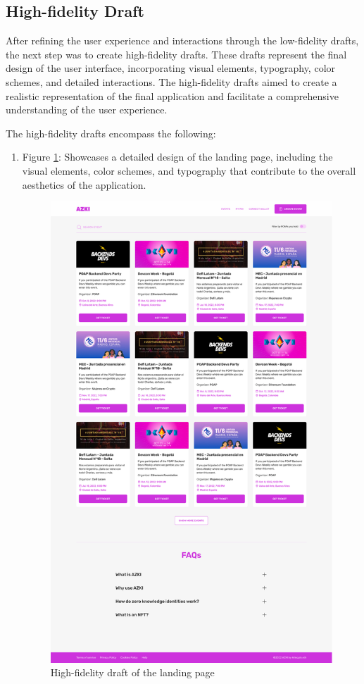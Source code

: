 \subsection{High-fidelity Draft}

After refining the user experience and interactions through the low-fidelity drafts, the next step was to create high-fidelity drafts. These drafts represent the final design of the user interface, incorporating visual elements, typography, color schemes, and detailed interactions. The high-fidelity drafts aimed to create a realistic representation of the final application and facilitate a comprehensive understanding of the user experience.

The high-fidelity drafts encompass the following:

\begin{enumerate}
\item Figure \ref{Abb11}: Showcases a detailed design of the landing page, including the visual elements, color schemes, and typography that contribute to the overall aesthetics of the application. \
\begin{figure}[H]
\centering
\includegraphics[width=0.8\linewidth]{PICs/HiFiLanding.png}
\caption{High-fidelity draft of the landing page}\label{Abb11}
\end{figure}


\end{enumerate}
